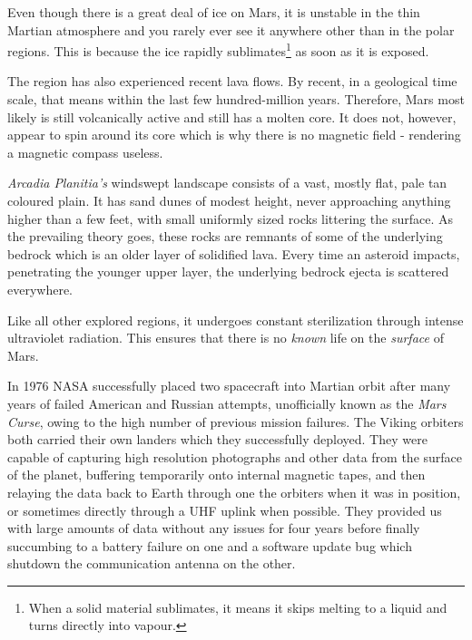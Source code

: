 Even though there is a great deal of ice on Mars, it is unstable in the thin Martian atmosphere and you rarely ever see it anywhere other than in the polar regions. This is because the ice rapidly sublimates\footnote{When a solid material sublimates, it means it skips melting to a liquid and turns directly into vapour.} as soon as it is exposed.

The region has also experienced recent lava flows. By recent, in a geological time scale, that means within the last few hundred-million years. Therefore, Mars most likely is still volcanically active and still has a molten core. It does not, however, appear to spin around its core which is why there is no magnetic field - rendering a magnetic compass useless.

    {}
    {}
    {}
    \stopcombination

{\it Arcadia Planitia's} windswept landscape consists of a vast, mostly flat, pale tan coloured plain. It has sand dunes of modest height, never approaching anything higher than a few feet, with small uniformly sized rocks littering the surface. As the prevailing theory goes, these rocks are remnants of some of the underlying bedrock which is an older layer of solidified lava. Every time an asteroid impacts, penetrating the younger upper layer, the underlying bedrock ejecta is scattered everywhere.

Like all other explored regions, it undergoes constant sterilization through intense ultraviolet radiation. This ensures that there is no {\it known} life on the {\it surface} of Mars.


In 1976 NASA successfully placed two spacecraft into Martian orbit after many years of failed American and Russian attempts, unofficially known as the {\it Mars Curse}, owing to the high number of previous mission failures. The Viking orbiters both carried their own landers which they successfully deployed. They were capable of capturing high resolution photographs and other data from the surface of the planet, buffering temporarily onto internal magnetic tapes, and then relaying the data back to Earth through one the orbiters when it was in position, or sometimes directly through a UHF uplink when possible. They provided us with large amounts of data without any issues for four years before finally succumbing to a battery failure on one and a software update bug which shutdown the communication antenna on the other.

